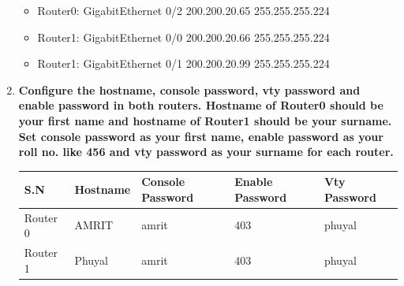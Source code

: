 \documentclass[a4paper,11pt]{article}
\begin{document}
\begin{enumerate}
            \begin{itemize}
                  \item Router0: GigabitEthernet 0/2 200.200.20.65 255.255.255.224

                  \item Router1: GigabitEthernet 0/0 200.200.20.66 255.255.255.224

                  \item Router1: GigabitEthernet 0/1 200.200.20.99 255.255.255.224
            \end{itemize}

      \item \textbf{Configure the hostname, console password, vty password and enable password in both routers. Hostname of Router0 should be your first name and hostname of Router1 should be your surname. Set console password as your first name, enable password as your roll no. like 456 and vty password as your surname for each router.}

            \begin{table}[H]
                  \centering
                  \begin{tabular}{|l|l|l|l|l|}
                        \hline
                        \rowcolor[rgb]{0.424,0.412,0.925} {\cellcolor[rgb]{0.255,0.824,0.576}}S.N & Hostname & Console Password & Enable Password & Vty Password \\
                        \hline
                        {\cellcolor[rgb]{0.255,0.824,0.576}}Router 0                              & AMRIT    & amrit            & 403             & phuyal       \\
                        \hline
                        {\cellcolor[rgb]{0.255,0.824,0.576}}Router 1                              & Phuyal   & amrit            & 403             & phuyal       \\
                        \hline
                  \end{tabular}
            \end{table}


\end{enumerate}
\end{document}
